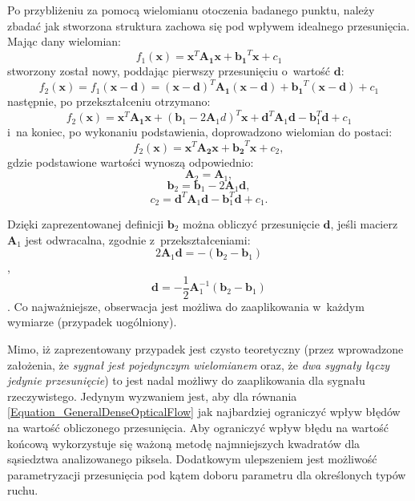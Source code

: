    Po przybliżeniu za pomocą wielomianu otoczenia badanego punktu, należy zbadać jak stworzona struktura zachowa się pod wpływem idealnego przesunięcia. Mając dany wielomian: \[ f_{1}(\mathbf{x}) = \mathbf{x}^{T}\mathbf{A_{1}}\mathbf{x} + \mathbf{b_{1}}^{T}\mathbf{x} + c_{1} \] stworzony został nowy, poddając pierwszy przesunięciu o~wartość $\mathbf{d}$: \[
      f_{2}(\mathbf{x}) = f_{1}(\mathbf{x-d}) = (\mathbf{x-d})^{T}\mathbf{A_{1}}(\mathbf{x-d}) + \mathbf{b_{1}}^{T}(\mathbf{x-d}) + c_{1}
    \] następnie, po przekształceniu otrzymano: \[
        f_{2}(\mathbf{x}) = \mathbf{x}^{T}\mathbf{A_{1}}\mathbf{x} + (\mathbf{b}_{1} - 2\mathbf{A}_{1}d)^{T}\mathbf{x} + \mathbf{d}^{T}\mathbf{A}_{1}\mathbf{d} - \mathbf{b}_{1}^{T}\mathbf{d} + c_{1}
    \] i~na koniec, po wykonaniu podstawienia, doprowadzono wielomian do postaci: \[
        f_{2}(\mathbf{x}) = \mathbf{x}^{T}\mathbf{A_{2}}\mathbf{x} + \mathbf{b_{2}}^{T}\mathbf{x} + c_{2},
    \] gdzie podstawione wartości wynoszą odpowiednio:
    \[ \mathbf{A}_{2} = \mathbf{A}_{1}, \]
    \[ \mathbf{b}_{2} = \mathbf{b}_{1} - 2\mathbf{A}_{1}\mathbf{d}, \]
    \[ c_{2} = \mathbf{d}^{T}\mathbf{A}_{1}\mathbf{d} - \mathbf{b}_{1}^{T}\mathbf{d} + c_{1}. \]

    Dzięki zaprezentowanej definicji $\mathbf{b}_{2}$ można obliczyć przesunięcie $\mathbf{d}$, jeśli macierz $\mathbf{A}_{1}$ jest odwracalna, zgodnie z~przekształceniami:
    \begin{equation}\label{Equation_GeneralDenseOpticalFlow}
      2\mathbf{A}_{1}\mathbf{d} = -(\mathbf{b}_{2} - \mathbf{b}_{1})
    \end{equation},
    \[ \mathbf{d} = -\frac{1}{2}\mathbf{A}_{1}^{-1}(\mathbf{b}_{2} - \mathbf{b}_{1}) \].
    Co najważniejsze, obserwacja jest możliwa do zaaplikowania w~każdym wymiarze (przypadek uogólniony).

    Mimo, iż zaprezentowany przypadek jest czysto teoretyczny (przez wprowadzone założenia, że \textit{sygnał jest pojedynczym wielomianem} oraz, że \textit{dwa sygnały łączy jedynie przesunięcie}) to jest nadal możliwy do zaaplikowania dla sygnału rzeczywistego. Jedynym wyzwaniem jest, aby dla równania \ref{Equation_GeneralDenseOpticalFlow} jak najbardziej ograniczyć wpływ błędów na wartość obliczonego przesunięcia. Aby ograniczyć wpływ błędu na wartość końcową wykorzystuje się ważoną metodę najmniejszych kwadratów dla sąsiedztwa analizowanego piksela. Dodatkowym ulepszeniem jest możliwość parametryzacji przesunięcia pod kątem doboru parametru dla określonych typów ruchu.

